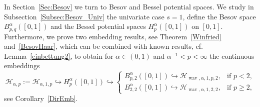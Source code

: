\documentclass[12pt]{article}
\DeclareMathOperator{\wav}{wav}
\newcommand{\HH}{\mathcal{H}}
\begin{document}
In Section~\ref{Sec:Besov} we turn to Besov and Bessel potential spaces. 
We study  in Subsection~\ref{Subsec:Besov_Univ} the univariate case $s=1$, define the Besov space $B^\alpha_{p, q}([0,1])$ and the Bessel potential spaces $H^\alpha_p([0,1])$ on $[0,1]$.
Furthermore, we prove two embedding results, see Theorem~\ref{Winfried} and~\ref{BesovHaar}, which can be combined with known results, cf. Lemma~\ref{einbettung2},   
to obtain for $\alpha\in (0, 1)$ and $\alpha^{-1} < p  < \infty$ the continuous embeddings
\begin{equation*}
\mathcal{H}_{\alpha, p} := \mathcal{H}_{\alpha, 1, p}  \hookrightarrow H^\alpha_{p}([0,1])
\hookrightarrow 
\begin{cases}
B^\alpha_{p, 2}([0,1]) \hookrightarrow \HH_{\wav,\alpha,1, p, 2}, & \text{if $p < 2$,}\\
 B^\alpha_{2, 2}([0,1]) \hookrightarrow \HH_{\wav,\alpha, 1, 2, 2}, & \text{if $p \ge 2$,}
\end{cases}
\end{equation*}
see Corollary~\ref{DirEmb}.

\end{document}
